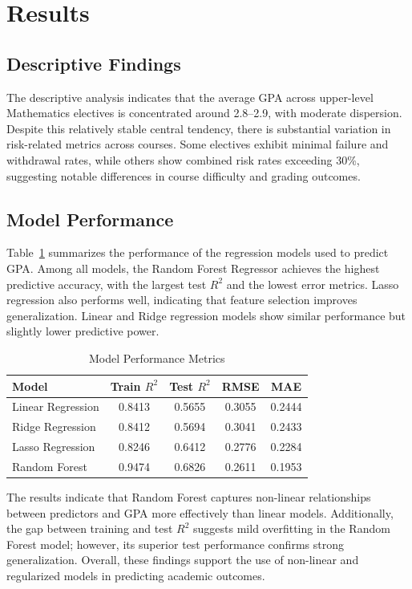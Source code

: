 \documentclass[a4paper,12pt,reqno]{amsart}
\numberwithin{equation}{section}
\theoremstyle{plain}
\theoremstyle{definition}
\begin{document}
\section{Results}

\subsection{Descriptive Findings}

The descriptive analysis indicates that the average GPA across upper-level Mathematics electives is concentrated around 2.8--2.9, with moderate dispersion. Despite this relatively stable central tendency, there is substantial variation in risk-related metrics across courses. Some electives exhibit minimal failure and withdrawal rates, while others show combined risk rates exceeding 30\%, suggesting notable differences in course difficulty and grading outcomes.

\subsection{Model Performance}

Table~\ref{tab:metrics} summarizes the performance of the regression models used to predict GPA. Among all models, the Random Forest Regressor achieves the highest predictive accuracy, with the largest test $R^2$ and the lowest error metrics. Lasso regression also performs well, indicating that feature selection improves generalization. Linear and Ridge regression models show similar performance but slightly lower predictive power.

\begin{table}[H]
\centering
\caption{Model Performance Metrics}
\label{tab:metrics}
\begin{tabular}{lcccc}
\hline
Model & Train $R^2$ & Test $R^2$ & RMSE & MAE \\
\hline
Linear Regression & 0.8413 & 0.5655 & 0.3055 & 0.2444 \\
Ridge Regression  & 0.8412 & 0.5694 & 0.3041 & 0.2433 \\
Lasso Regression  & 0.8246 & 0.6412 & 0.2776 & 0.2284 \\
Random Forest     & 0.9474 & 0.6826 & 0.2611 & 0.1953 \\
\hline
\end{tabular}
\end{table}

The results indicate that Random Forest captures non-linear relationships between predictors and GPA more effectively than linear models. Additionally, the gap between training and test $R^2$ suggests mild overfitting in the Random Forest model; however, its superior test performance confirms strong generalization. Overall, these findings support the use of non-linear and regularized models in predicting academic outcomes.
\end{document}
